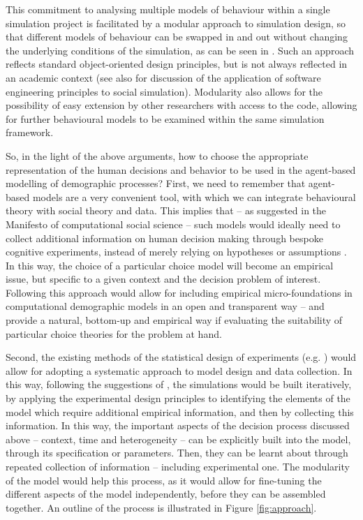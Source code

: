 \documentclass{article}
\begin{document}
This commitment to analysing multiple models of behaviour within a single simulation project is facilitated by a modular approach to simulation design, so that different models of behaviour can be swapped in and out without changing the underlying conditions of the simulation, as can be seen in \citet{Gray2016}. Such an approach reflects standard object-oriented design principles, but is not always reflected in an academic context (see also \citet{Rossiter2015} for discussion of the application of software engineering principles to social simulation). Modularity also allows for the possibility of easy extension by other researchers with access to the code, allowing for further behavioural models to be examined within the same simulation framework.

So, in the light of the above arguments, how to choose the appropriate representation of the human decisions and behavior to be used in the agent-based modelling of demographic processes? First, we need to remember that agent-based models are a very convenient tool, with which we can integrate behavioural theory with social theory and data. This implies that – as suggested in the Manifesto of computational social science \citep{Conte} – such models would ideally need to collect additional information on human decision making through bespoke cognitive experiments, instead of merely relying on hypotheses or assumptions \citep{Courgeau}. In this way, the choice of a particular choice model will become an empirical issue, but specific to a given context and the decision problem of interest. Following this approach would allow for including empirical micro-foundations in computational demographic models in an open and transparent way – and provide a natural, bottom-up and empirical way if evaluating the suitability of particular choice theories for the problem at hand.


Second, the existing methods of the statistical design of experiments (e.g. \citeauthor{Chaloner} \citeyear{Chaloner}) would allow for adopting a systematic approach to model design and data collection. In this way, following the suggestions of \citet{Courgeau}, the simulations would be built iteratively, by applying the experimental design principles to identifying the elements of the model which require additional empirical information, and then by collecting this information.  In this way, the important aspects of the decision process discussed above – context, time and heterogeneity – can be explicitly built into the model, through its specification or parameters. Then, they can be learnt about through repeated collection of information – including experimental one. The modularity of the model would help this process, as it would allow for fine-tuning the different aspects of the model independently, before they can be assembled together. An outline of the process is illustrated in Figure \ref{fig:approach}.
\end{document}
